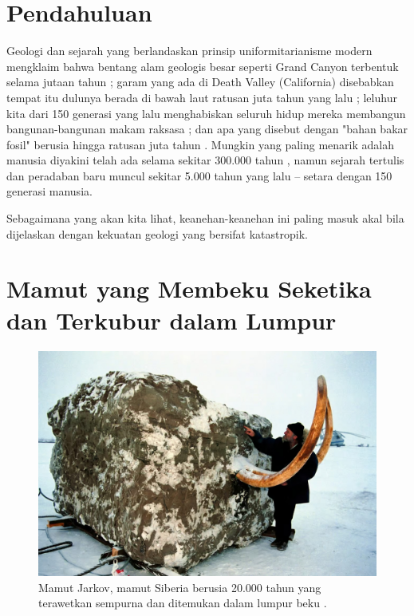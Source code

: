 \documentclass[10pt,twocolumn,letterpaper]{article}
\begin{document}

\section{Pendahuluan}

Geologi dan sejarah yang berlandaskan prinsip uniformitarianisme modern mengklaim bahwa bentang alam geologis besar seperti Grand Canyon terbentuk selama jutaan tahun \cite{143}; garam yang ada di Death Valley (California) disebabkan tempat itu dulunya berada di bawah laut ratusan juta tahun yang lalu \cite{144}; leluhur kita dari 150 generasi yang lalu menghabiskan seluruh hidup mereka membangun bangunan-bangunan makam raksasa \cite{29,70}; dan apa yang disebut dengan "bahan bakar fosil" berusia hingga ratusan juta tahun \cite{104}. Mungkin yang paling menarik adalah manusia diyakini telah ada selama sekitar 300.000 tahun \cite{145}, namun sejarah tertulis dan peradaban baru muncul sekitar 5.000 tahun yang lalu – setara dengan 150 generasi manusia.

Sebagaimana yang akan kita lihat, keanehan-keanehan ini paling masuk akal bila dijelaskan dengan kekuatan geologi yang bersifat katastropik.

\section{Mamut yang Membeku Seketika dan Terkubur dalam Lumpur}

\begin{figure}[t]
\begin{center}
   \includegraphics[width=1\linewidth]{jarkov-mammoth.jpg}
\end{center}
   \caption{Mamut Jarkov, mamut Siberia berusia 20.000 tahun yang terawetkan sempurna dan ditemukan dalam lumpur beku \cite{51}.}
\label{fig:1}

\label{fig:onecol}
\end{figure}
\end{document}

